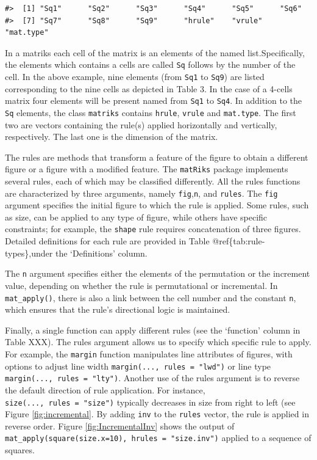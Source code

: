 \begin{verbatim}
#>  [1] "Sq1"      "Sq2"      "Sq3"      "Sq4"      "Sq5"      "Sq6"     
#>  [7] "Sq7"      "Sq8"      "Sq9"      "hrule"    "vrule"    "mat.type"
\end{verbatim}

In a matriks each cell of the matrix is an elements of the named list.Specifically, the elements which contains a cells are called \texttt{Sq} follows by the number of the cell.
In the above example, nine elements (from \texttt{Sq1} to \texttt{Sq9}) are listed corresponding to the nine cells as depicted in Table 3.
In the case of a 4-cells matrix four elements will be present named from \texttt{Sq1} to \texttt{Sq4}.
In addition to the \texttt{Sq} elements, the class \texttt{matriks} contains \texttt{hrule}, \texttt{vrule} and \texttt{mat.type}.
The first two are vectors containing the rule(s) applied horizontally and vertically, respectively.
The last one is the dimension of the matrix.

The rules are methods that transform a feature of the figure to obtain a different figure or a figure with a modified feature.
The \texttt{matRiks} package implements several rules, each of which may be classified differently.
All the rules functions are characterized by three arguments, namely \texttt{fig},\texttt{n}, and \texttt{rules}.
The \texttt{fig} argument specifies the initial figure to which the rule is applied.
Some rules, such as size, can be applied to any type of figure, while others have specific constraints; for example, the \texttt{shape} rule requires concatenation of three figures.
Detailed definitions for each rule are provided in Table @ref\{tab:rule-types\},under the `Definitions' column.

The \texttt{n} argument specifies either the elements of the permutation or the increment value, depending on whether the rule is permutational or incremental.
In \texttt{mat\_apply()}, there is also a link between the cell number and the constant \texttt{n}, which ensures that the rule's directional logic is maintained.

Finally, a single function can apply different rules (see the `function' column in Table XXX).
The rules argument allows us to specify which specific rule to apply.
For example, the \texttt{margin} function manipulates line attributes of figures, with options to adjust line width \texttt{margin(...,\ rules\ =\ "lwd")} or line type \texttt{margin(...,\ rules\ =\ "lty")}.
Another use of the rules argument is to reverse the default direction of rule application.
For instance, \texttt{size(...,\ rules\ =\ "size")} typically decreases in size from right to left (see Figure \ref{fig:incremental}.
By adding \texttt{inv} to the \texttt{rules} vector, the rule is applied in reverse order.
Figure \ref{fig:IncrementalInv} shows the output of \texttt{mat\_apply(square(size.x=10),\ hrules\ =\ "size.inv")} applied to a sequence of squares.

